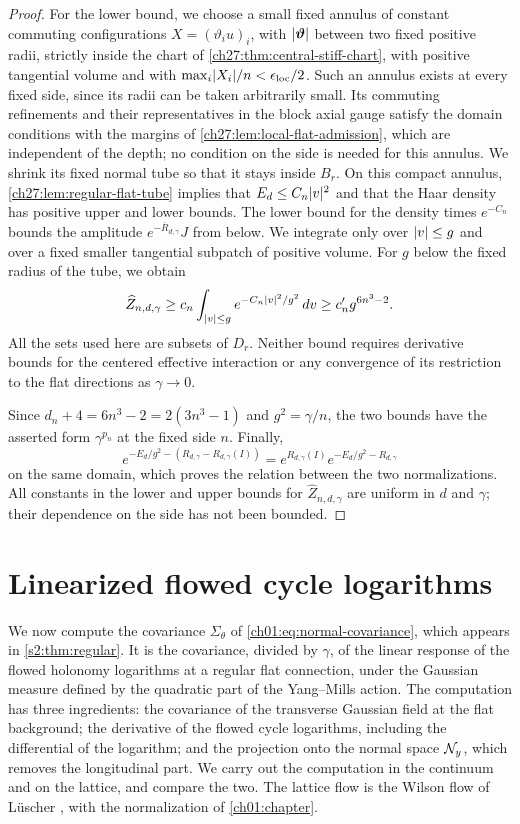 \begin{proof}
For the lower bound, we choose a small fixed annulus of constant commuting configurations $X=(\vartheta_iu)_i$, with $\lvert \bm\vartheta\rvert$ between two fixed positive radii, strictly inside the chart of \cref{ch27:thm:central-stiff-chart}, with positive tangential volume and with $\max_i\lvert X_i\rvert/n<\epsilon_{\mathrm{loc}}/2$. Such an annulus exists at every fixed side, since its radii can be taken arbitrarily small. Its commuting refinements and their representatives in the block axial gauge satisfy the domain conditions with the margins of \cref{ch27:lem:local-flat-admission}, which are independent of the depth; no condition on the side is needed for this annulus. We shrink its fixed normal tube so that it stays inside $B_r$. On this compact annulus, \cref{ch27:lem:regular-flat-tube} implies that $E_d\le C_n\lvert v\rvert^2$ and that the Haar density has positive upper and lower bounds. The lower bound for the density times $e^{-C_n}$ bounds the amplitude $e^{-\overline R_{d,\gamma}}J$ from below. We integrate only over $\lvert v\rvert\le g$ and over a fixed smaller tangential subpatch of positive volume. For $g$ below the fixed radius of the tube, we obtain
\[
 \widehat Z_{n,d,\gamma}\ge c_n\int_{\lvert v\rvert\le g}e^{-C_n\lvert v\rvert^2/g^2}\,dv\ge c_n'g^{6n^3-2}.
\]
All the sets used here are subsets of $D_r$. Neither bound requires derivative bounds for the centered effective interaction or any convergence of its restriction to the flat directions as $\gamma\to0$.

Since $d_n+4=6n^3-2=2(3n^3-1)$ and $g^2=\gamma/n$, the two bounds have the asserted form $\gamma^{p_n}$ at the fixed side $n$. Finally,
\[
 e^{-E_d/g^2-(R_{d,\gamma}-R_{d,\gamma}(I))}=e^{R_{d,\gamma}(I)}e^{-E_d/g^2-R_{d,\gamma}}
\]
on the same domain, which proves the relation between the two normalizations. All constants in the lower and upper bounds for $\widehat Z_{n,d,\gamma}$ are uniform in $d$ and $\gamma$; their dependence on the side has not been bounded.
\end{proof}

\section{Linearized flowed cycle logarithms}\label{ch27:sec:covariance}

We now compute the covariance $\Sigma_\theta$ of \eqref{ch01:eq:normal-covariance}, which appears in \cref{s2:thm:regular}. It is the covariance, divided by $\gamma$, of the linear response of the flowed holonomy logarithms at a regular flat connection, under the Gaussian measure defined by the quadratic part of the Yang--Mills action. The computation has three ingredients: the covariance of the transverse Gaussian field at the flat background; the derivative of the flowed cycle logarithms, including the differential of the logarithm; and the projection onto the normal space $\mathcal N_{y}$, which removes the longitudinal part. We carry out the computation in the continuum and on the lattice, and compare the two. The lattice flow is the Wilson flow of L\"uscher \cite{Luscher2010WilsonFlow}, with the normalization of \cref{ch01:chapter}.

